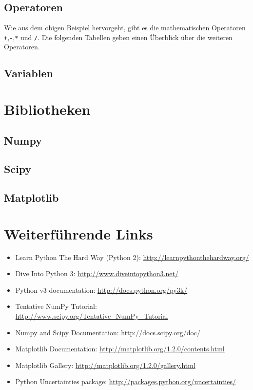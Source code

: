 \subsection{Operatoren}
Wie aus dem obigen Beispiel hervorgeht, gibt es die mathematischen Operatoren \texttt{+},\texttt{-},\texttt{*} und \texttt{/}. Die folgenden Tabellen geben einen Überblick über die weiteren Operatoren.

\subsection{Variablen}

\section{Bibliotheken}
\subsection{Numpy}
\subsection{Scipy}
\subsection{Matplotlib}

\section{Weiterführende Links}
\begin{itemize}
  \item Learn Python The Hard Way (Python 2): \url{http://learnpythonthehardway.org/}
  \item Dive Into Python 3: \url{http://www.diveintopython3.net/}
  \item Python v3 documentation: \url{http://docs.python.org/py3k/}
  \item Tentative NumPy Tutorial: \url{http://www.scipy.org/Tentative\_NumPy\_Tutorial}
  \item Numpy and Scipy Documentation: \url{http://docs.scipy.org/doc/}
  \item Matplotlib Documentation: \url{http://matplotlib.org/1.2.0/contents.html}
  \item Matplotlib Gallery: \url{http://matplotlib.org/1.2.0/gallery.html}
  \item Python Uncertainties package: \url{http://packages.python.org/uncertainties/}
\end{itemize}
